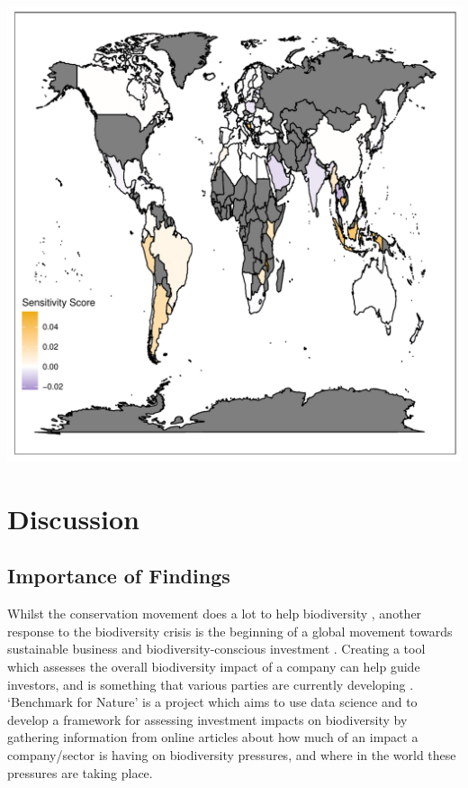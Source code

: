 \documentclass[11pt, a4paper, titlepage]{article}
\begin{document}
	\includegraphics[scale=0.95]{../images/invasivesensitivitymapgradient.pdf}
	

    \clearpage
    
    
    
     \section*{Discussion}
     
     \subsection*{Importance of Findings}
     Whilst the conservation movement does a lot to help biodiversity \citep{sandbrook2019global}, another response to the biodiversity crisis \citep{ogar2020science} is the beginning of a global movement towards sustainable business and biodiversity-conscious investment \citep{pri2020, worldeconomicforum2020, wwf2020}. Creating a tool which assesses the overall biodiversity impact of a company can help guide investors, and is something that various parties are currently developing \citep{worldbenchmarkingalliance_2022, iccs_2020}.  `Benchmark for Nature' is a project which aims to use data science and to develop a framework for assessing investment impacts on biodiversity by gathering information from online articles about how much of an impact a company/sector is having on biodiversity pressures\citep{iccs_2020}, and where in the world these pressures are taking place. \newline
     \clearpage
     
\end{document}

